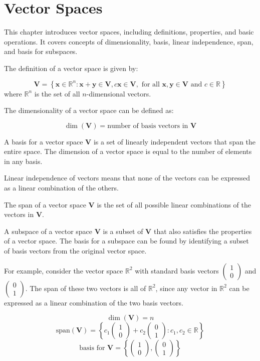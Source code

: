 \section*{Vector Spaces}

This chapter introduces vector spaces, including definitions, properties, and basic operations. It covers concepts of dimensionality, basis, linear independence, span, and basis for subspaces.

The definition of a vector space is given by:

$$
 \mathbf{V} = \left\{ \mathbf{x} \in \mathbb{R}^n : \mathbf{x} + \mathbf{y} \in \mathbf{V}, c\mathbf{x} \in \mathbf{V}, \text{ for all } \mathbf{x}, \mathbf{y} \in \mathbf{V} \text{ and } c \in \mathbb{R} \right\}
$$
where $\mathbb{R}^n$ is the set of all $n$-dimensional vectors.

The dimensionality of a vector space can be defined as:

$$
\dim(\mathbf{V}) = \text{number of basis vectors in }\mathbf{V}
$$

A basis for a vector space $\mathbf{V}$ is a set of linearly independent vectors that span the entire space. The dimension of a vector space is equal to the number of elements in any basis.

Linear independence of vectors means that none of the vectors can be expressed as a linear combination of the others.

The span of a vector space $\mathbf{V}$ is the set of all possible linear combinations of the vectors in $\mathbf{V}$.

A subspace of a vector space $\mathbf{V}$ is a subset of $\mathbf{V}$ that also satisfies the properties of a vector space. The basis for a subspace can be found by identifying a subset of basis vectors from the original vector space.

For example, consider the vector space $\mathbb{R}^2$ with standard basis vectors $\begin{pmatrix} 1 \\ 0 \end{pmatrix}$ and $\begin{pmatrix} 0 \\ 1 \end{pmatrix}$. The span of these two vectors is all of $\mathbb{R}^2$, since any vector in $\mathbb{R}^2$ can be expressed as a linear combination of the two basis vectors.

$$
\dim(\mathbf{V}) = n
$$
$$
\text{span}(\mathbf{V}) = \left\{ c_1\begin{pmatrix} 1 \\ 0 \end{pmatrix} + c_2\begin{pmatrix} 0 \\ 1 \end{pmatrix} : c_1, c_2 \in \mathbb{R} \right\}
$$
$$
\text{basis for }\mathbf{V} = \left\{ \begin{pmatrix} 1 \\ 0 \end{pmatrix}, \begin{pmatrix} 0 \\ 1 \end{pmatrix} \right\}
$$